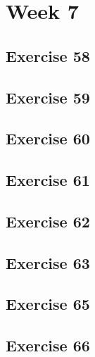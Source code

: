 \documentclass[a4paper]{article}
\let\stdsection\section
\renewcommand\section{\newpage\stdsection}
\begin{document}
\section*{Week 7}

\subsection*{Exercise 58}




\newpage
\subsection*{Exercise 59}


\newpage
\subsection*{Exercise 60}


\newpage
\subsection*{Exercise 61}


\newpage
\subsection*{Exercise 62}


\newpage
\subsection*{Exercise 63}


\newpage
\subsection*{Exercise 65}










\newpage
\subsection*{Exercise 66}










\end{document}
